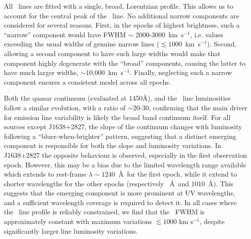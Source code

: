 \documentclass[fleqn,usenatbib]{mnras}
\begin{document}
All \civ\ lines are fitted with a single, broad, Lorentzian profile.
This allows us to account for the central peak of the \civ\ line.  No
additional narrow components are considered for several reasons.
First, in the epochs of highest brightness, such a ``narrow''
component would have FWHM $\sim$ 2000-3000~km~s$^{-1}$, i.e. values
exceeding the usual widths of genuine narrow lines ($\lesssim
1000$~km~s$^{-1}$). Second, allowing a second component to have such
large widths would make that component highly degenerate with the
``broad'' components, causing the latter to have much larger widths,
$\sim$10,000~km~s$^{-1}$.  Finally, neglecting such a narrow
component ensures a consistent model across all epochs.

Both the quasar continuum (evaluated at 1450\AA), and the \civ\ line
luminosities follow a similar evolution, with a ratio of $\sim$20-30,
confirming that the main driver for emission line variability is
likely the broad band continuum itself.  For all sources except
J1638+2827, the slope of the continuum changes with luminosity
following a ``bluer-when-brighter'' pattern, suggesting that a
distinct emerging component is responsible for both the slope and
luminosity variations.  In J1638+2827 the opposite behaviour is
observed, especially in the first observation epoch.  However, this
may be a bias due to the limited wavelength range available which
extends to rest-frame $\lambda \sim 1240$~\AA\ for the first epoch,
while it extend to shorter wavelengths for the other epochs
(respectively ~\AA\ and 1010~\AA).  This suggests that the emerging
component is more prominent at UV wavelengths, and a sufficient
wavelength coverage is required to detect it. In all cases where the
\civ\ line profile is reliably constrained, we find that the \civ\
FWHM is approximately constant with maximum variations $\lesssim 1000$
km s$^{-1}$, despite significantly larger line luminosity variations.
\end{document}
